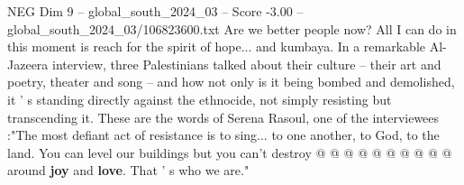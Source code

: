\begin{textsample}{NEG Dim 9 – global\_south\_2024\_03 – Score -3.00 – global\_south\_2024\_03/106823600.txt}
Are we better people now?
All I can do in this moment is reach for the spirit of hope... and kumbaya.
In a remarkable Al-Jazeera interview, three Palestinians talked about their culture -- their art and poetry, theater and song -- and how not only is it being bombed and demolished, it ' s standing directly against the ethnocide, not simply resisting but transcending it.
These are the words of Serena Rasoul, one of the interviewees :"The most defiant act of resistance is to sing... to one another, to God, to the land.
You can level our buildings but you can't destroy @ @ @ @ @ @ @ @ @ @ around \textbf{joy} and \textbf{love}.
That ' s who we are."

\end{textsample}
